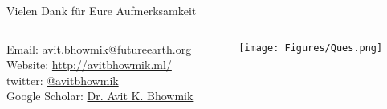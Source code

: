 \documentclass{beamer}
\begin{document}

\begin{frame}
\frametitle{}
\centering
\LARGE Vielen Dank für Eure Aufmerksamkeit\\
\normalsize
\begin{columns}
\begin{column}{0.6\textwidth}
\footnotesize
   Email: \href{mailto:avit.bhowmik@futureearth.org}{\alert{avit.bhowmik@futureearth.org}}\\
   Website: \href{http://avitbhowmik.ml/}{\alert{http://avitbhowmik.ml/}}\\
twitter: \href{https://twitter.com/avitbhowmik}{\alert{@avitbhowmik}}\\
   Google Scholar: \href{https://scholar.google.se/citations?user=laRo5pgAAAAJ&hl=en}{\alert{Dr. Avit K. Bhowmik}}
\end{column}
\begin{column}{0.4\textwidth}
    \begin{center}
     \texttt{[image: Figures/Ques.png]}
     \end{center}
\end{column}
\end{columns}
\end{frame}

\end{document}
